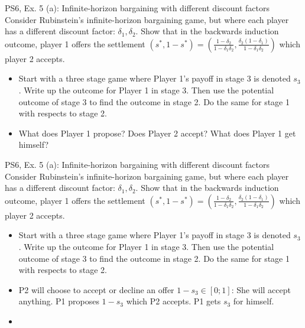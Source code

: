 \begin{frame}{PS6, Ex. 5 (a): Infinite-horizon bargaining with different discount factors}
    Consider Rubinstein's infinite-horizon bargaining game, but where each player has a different discount factor: $\delta_1,\delta_2$. Show that in the backwards induction outcome, player 1 offers the settlement
    $(s^{*},1-s^{*})=\left( \frac{1-\delta_2}{1-\delta_1\delta_2},\frac{\delta_2(1-\delta_1)}{1-\delta_1\delta_2}\right)$
    which player 2 accepts.
    \begin{itemize}
      \item[(Step a)] Start with a three stage game where Player 1's payoff in stage 3 is denoted $s_3$. Write up the outcome for Player 1 in stage 3. Then use the potential outcome of stage 3 to find the outcome in stage 2. Do the same for stage 1 with respects to stage 2.
    \end{itemize}
    \begin{itemize}
        \item[Stage 3] What does Player 1 propose? Does Player 2 accept? What does Player 1 get himself?
    \end{itemize}
    \vfill\null
\end{frame}
\begin{frame}{PS6, Ex. 5 (a): Infinite-horizon bargaining with different discount factors}
    Consider Rubinstein's infinite-horizon bargaining game, but where each player has a different discount factor: $\delta_1,\delta_2$. Show that in the backwards induction outcome, player 1 offers the settlement
    $(s^{*},1-s^{*})=\left( \frac{1-\delta_2}{1-\delta_1\delta_2},\frac{\delta_2(1-\delta_1)}{1-\delta_1\delta_2}\right)$
    which player 2 accepts.
    \begin{itemize}
      \item[(Step a)] Start with a three stage game where Player 1's payoff in stage 3 is denoted $s_3$. Write up the outcome for Player 1 in stage 3. Then use the potential outcome of stage 3 to find the outcome in stage 2. Do the same for stage 1 with respects to stage 2.
    \end{itemize}
    \begin{itemize}
        \item[Stage 3] P2 will choose to accept or decline an offer $1-s_3\in [0;1]$: She will accept anything. P1 proposes $1-s_3$ which P2 accepts. P1 gets $s_3$ for himself.
        \item[Stage 2]
    \end{itemize}
    \vfill\null
\end{frame}
